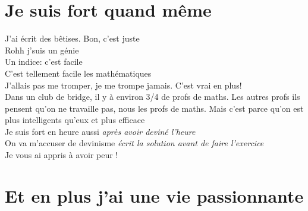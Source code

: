 \documentclass[french, a4paper, openany]{book}
\begin{document}
\section{Je suis fort quand même}

	\noindent \og J'ai écrit des bêtises. Bon, c'est juste \fg \\
	\og Rohh j'suis un génie \fg \\
	\og Un indice: c'est facile \fg \\
	\og C'est tellement facile les mathématiques \fg \\
	\og J'allais pas me tromper, je me trompe jamais. C'est vrai en plus! \fg \\
	\og Dans un club de bridge, il y à environ 3/4 de profs de maths. Les autres profs ils pensent qu'on ne travaille pas, nous les profs de maths. Mais c'est parce qu'on est plus intelligents qu'eux et plus efficace \fg \\
	\og Je suis fort en heure aussi \fg \emph{après avoir deviné l'heure} \\
	\og On va m'accuser de devinisme \fg \emph{écrit la solution avant de faire l'exercice} \\
	\og Je vous ai appris à avoir peur ! \fg \\

\section{Et en plus j'ai une vie passionnante}
\end{document}
